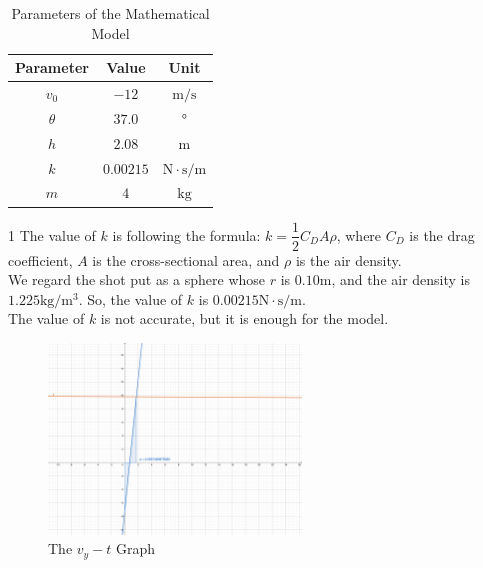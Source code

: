 \documentclass{article}
\begin{document}
\begin{table}[H]
  \centering
  \begin{threeparttable}
    \begin{tabular}{ccc}
      \hline
      \hspace{1cm}\textbf{Parameter}\hspace{1cm} & \hspace{1cm}\textbf{Value}\hspace{1cm} & \hspace{1cm}\textbf{Unit}\hspace{1cm} \\
      \hline
      $v_0$ & $-12$ & $\si{\meter/\second}$ \\
      $\theta$ & $37.0$ & $\si{\degree}$ \\
      $h$ & $2.08$ & $\si{\meter}$ \\
      $k$ & $0.00215$ \tnote{1} & $\si{\newton\cdot\second/\meter}$ \\
      $m$ & $4$ & $\si{\kilo\gram}$ \\
      \hline
    \end{tabular}
    \begin{tablenotes}
      \item [1] The value of $k$ is following the formula: $k=\dfrac{1}{2}C_DA\rho$, where $C_D$ is the drag coefficient, $A$ is the cross-sectional area, and $\rho$ is the air density. \\
      We regard the shot put as a sphere whose $r$ is $0.10 \si{\meter}$, and the air density is $1.225\si{\kilo\gram/\meter^3}$. So, the value of $k$ is $0.00215\si{\newton\cdot\second/\meter}$. \\
      The value of $k$ is not accurate, but it is enough for the model.
    \end{tablenotes}
  \end{threeparttable}
  \label{table:parameters-data}
  \caption{Parameters of the Mathematical Model}
\end{table}

\begin{figure}[H]
    \centering
    \includegraphics[width=0.6\textwidth]{figures/figure-1.pdf}
    \caption{The $v_y-t$ Graph}
    \label{fig:vy-t}
\end{figure}
\end{document}
